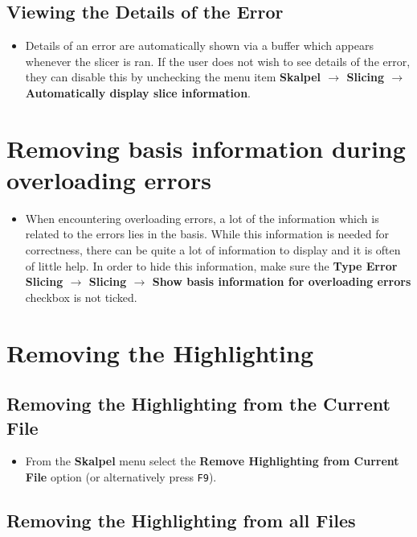 \documentclass{report}
\begin{document}
\subsection{Viewing the Details of the Error}

\begin{itemize}
\item Details of an error are automatically shown via a buffer which
  appears whenever the slicer is ran. If the user does not wish to see
  details of the error, they can disable this by unchecking the menu
  item \textbf{Skalpel $\rightarrow$ Slicing $\rightarrow$ Automatically display
    slice information}.
\end{itemize}

\section{Removing basis information during overloading errors}
\begin{itemize}
\item When encountering overloading errors, a lot of the information
  which is related to the errors lies in the basis. While this
  information is needed for correctness, there can be quite a lot of
  information to display and it is often of little help. In order to
  hide this information, make sure the \textbf{Type Error Slicing $\rightarrow$
    Slicing $\rightarrow$ Show basis information for overloading errors} checkbox
  is not ticked.
\end{itemize}


\section{Removing the Highlighting}

\subsection{Removing the Highlighting from the Current File}

\begin{itemize}
\item From the \textbf{Skalpel} menu select the \textbf{Remove
  Highlighting from Current File} option (or alternatively press
  \texttt{F9}).
\end{itemize}

\subsection{Removing the Highlighting from all Files}
\end{document}
